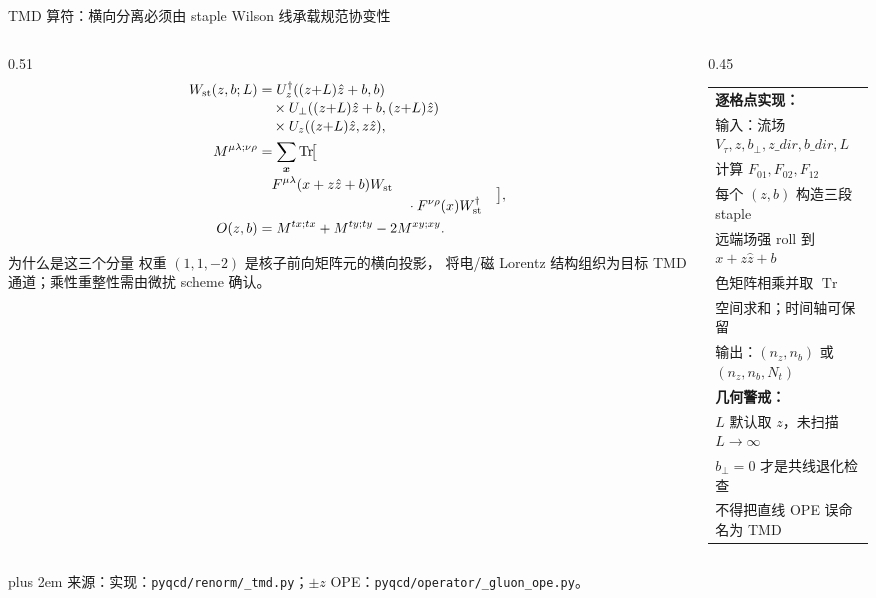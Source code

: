 \documentclass[UTF8,aspectratio=169,11pt]{ctexbeamer}
\newcommand{\source}[1]{%
  \par\vspace{0.02em}\begingroup\fontsize{6}{6.8}\selectfont\raggedright\sloppy
  \setlength{\emergencystretch}{3em}\rightskip=0pt plus 2em
  \color{muted}来源：#1\par\endgroup}
\newcommand{\Tr}{\operatorname{Tr}}
\begin{document}
\begin{frame}[t]{TMD 算符：横向分离必须由 staple Wilson 线承载规范协变性}
  \small
  \begin{columns}[T,totalwidth=\textwidth]
    \begin{column}{0.51\textwidth}
      {\footnotesize\begin{align*}
        W_{\rm st}(z,b;L)&=U_z^\dagger((z{+}L)\hat z+b,b)\\[-0.2em]
        &\quad\times U_\perp((z{+}L)\hat z+b,(z{+}L)\hat z)\\[-0.2em]
        &\quad\times U_z((z{+}L)\hat z,z\hat z),\\
        M^{\mu\lambda;\nu\rho}&=\sum_{\boldsymbol x}\Tr\!\bigl[\\[-0.2em]
        &\quad\begin{aligned}
          F^{\mu\lambda}(x+z\hat z+b)W_{\rm st}\\[-0.2em]
          &\quad{}\cdot F^{\nu\rho}(x)W_{\rm st}^\dagger
        \end{aligned}\bigr],\\
        O(z,b)&=M^{tx;tx}+M^{ty;ty}-2M^{xy;xy}.
      \end{align*}}
      \begin{block}{为什么是这三个分量}
        \footnotesize
        权重 \((1,1,-2)\) 是核子前向矩阵元的横向投影，
        将电/磁 Lorentz 结构组织为目标 TMD 通道；乘性重整性需由微扰 scheme 确认。
      \end{block}
    \end{column}
    \begin{column}{0.45\textwidth}
      \scriptsize
      \begin{tabularx}{0.94\linewidth}{@{}X@{}}
        \textbf{逐格点实现：}\\
        输入：流场 \(V_\tau,z,b_\perp,z\_dir,b\_dir,L\)\\
        \quad 计算 \(F_{01},F_{02},F_{12}\)\\
        \quad 每个 \((z,b)\) 构造三段 staple\\
        \quad 远端场强 roll 到 \(x+z\hat z+b\)\\
        \quad 色矩阵相乘并取 \(\Tr\)\\
        \quad 空间求和；时间轴可保留\\
        输出：\((n_z,n_b)\) 或 \((n_z,n_b,N_t)\)\\[0.3em]
        \textbf{几何警戒：}\\
        \quad \(L\) 默认取 \(z\)，未扫描 \(L\to\infty\)\\
        \quad \(b_\perp=0\) 才是共线退化检查\\
        \quad 不得把直线 OPE 误命名为 TMD\\
      \end{tabularx}
    \end{column}
  \end{columns}
  \vspace{-0.08em}
  \source{实现：\nolinkurl{pyqcd/renorm/_tmd.py}；\(\pm z\) OPE：\nolinkurl{pyqcd/operator/_gluon_ope.py}。}
\end{frame}
\end{document}
